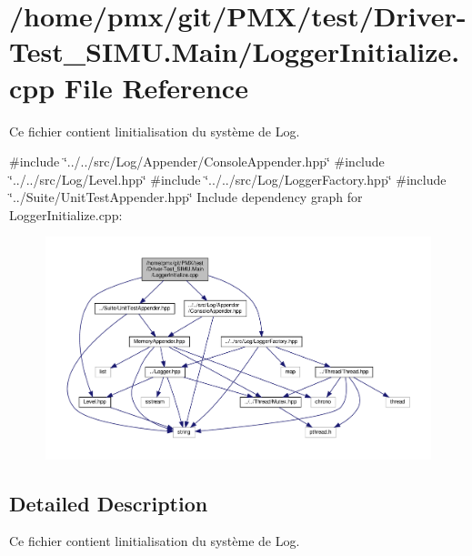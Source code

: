 \hypertarget{test_2Driver-Test__SIMU_8Main_2LoggerInitialize_8cpp}{}\section{/home/pmx/git/\+P\+M\+X/test/\+Driver-\/\+Test\+\_\+\+S\+I\+MU.Main/\+Logger\+Initialize.cpp File Reference}
\label{test_2Driver-Test__SIMU_8Main_2LoggerInitialize_8cpp}


Ce fichier contient l\textquotesingle{}initialisation du système de Log.  


{\ttfamily \#include \char`\"{}../../src/\+Log/\+Appender/\+Console\+Appender.\+hpp\char`\"{}}\newline
{\ttfamily \#include \char`\"{}../../src/\+Log/\+Level.\+hpp\char`\"{}}\newline
{\ttfamily \#include \char`\"{}../../src/\+Log/\+Logger\+Factory.\+hpp\char`\"{}}\newline
{\ttfamily \#include \char`\"{}../\+Suite/\+Unit\+Test\+Appender.\+hpp\char`\"{}}\newline
Include dependency graph for Logger\+Initialize.\+cpp\+:
\nopagebreak
\begin{figure}[H]
\begin{center}
\leavevmode
\includegraphics[width=350pt]{test_2Driver-Test__SIMU_8Main_2LoggerInitialize_8cpp__incl}
\end{center}
\end{figure}


\subsection{Detailed Description}
Ce fichier contient l\textquotesingle{}initialisation du système de Log. 

